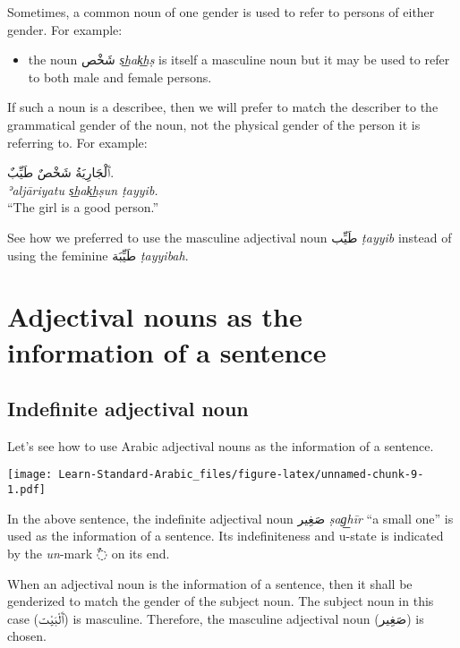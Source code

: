 \documentclass[
  10pt,
]{book}
\providecommand{\tightlist}{%
  \setlength{\itemsep}{0pt}\setlength{\parskip}{0pt}}
\begin{document}
Sometimes, a common noun of one gender is used to refer to persons of either gender. For example:

\begin{itemize}
\tightlist
\item
  the noun \foreignlanguage{arabic}{شَخْص} \emph{s͟hak͟hṣ} is itself a masculine noun but it may be used to refer to both male and female persons.
\end{itemize}

If such a noun is a describee, then we will prefer to match the describer to the grammatical gender of the noun, not the physical gender of the person it is referring to. For example:

\foreignlanguage{arabic}{ٱَلْجَارِيَةُ شَخْصٌ طَيِّبٌ.}\\
\emph{ʾaljāriyatu s͟hak͟hṣun ṭayyib.}\\
\enquote{The girl is a good person.}

See how we preferred to use the masculine adjectival noun \foreignlanguage{arabic}{طَيِّب} \emph{ṭayyib} instead of using the feminine \foreignlanguage{arabic}{طَيِّبَة} \emph{ṭayyibah}.

\section{Adjectival nouns as the information of a sentence}\label{adjectival-nouns-as-the-information-of-a-sentence}

\subsection{Indefinite adjectival noun}\label{indefinite-adjectival-noun}

Let's see how to use Arabic adjectival nouns as the information of a sentence.

\texttt{[image: Learn-Standard-Arabic\_files/figure-latex/unnamed-chunk-9-1.pdf]}

In the above sentence, the indefinite adjectival noun
\foreignlanguage{arabic}{صَغِير} \emph{ṣag͟hīr} \enquote{a small one}
is used as the information of a sentence. Its indefiniteness and u-state is indicated by the \emph{un}-mark \foreignlanguage{arabic}{◌ٌ} on its end.

When an adjectival noun is the information of a sentence, then it shall be genderized to match the gender of the subject noun. The subject noun in this case (\foreignlanguage{arabic}{ٱَلْبَيْت}) is masculine. Therefore, the masculine adjectival noun (\foreignlanguage{arabic}{صَغِير}) is chosen.
\end{document}
